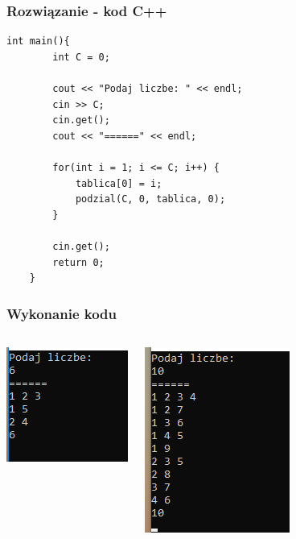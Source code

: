 \documentclass[aspectratio=169]{beamer}
\begin{document}
	\begin{frame}[fragile]
	\frametitle{Rozwiązanie - kod C++}

			\begin{lstlisting}[basicstyle=\footnotesize]
	int main(){   
		int C = 0;
	
		cout << "Podaj liczbe: " << endl;
		cin >> C;
		cin.get();
		cout << "======" << endl;
	
		for(int i = 1; i <= C; i++) {
			tablica[0] = i;
			podzial(C, 0, tablica, 0);
		}
	
		cin.get();
		return 0;
	}
			\end{lstlisting}

	
	\end{frame}

	\begin{frame}[fragile]
	\frametitle{Wykonanie kodu}
		\begin{columns}
			\begin{center}		
			\includegraphics[width=.6\linewidth]{source/1.png}
			\end{center}
			
			\begin{center}
			\includegraphics[width=.6\linewidth]{source/2.png}
  			\end{center}

		\end{columns}
	\end{frame}

	
		
	
\end{document}
